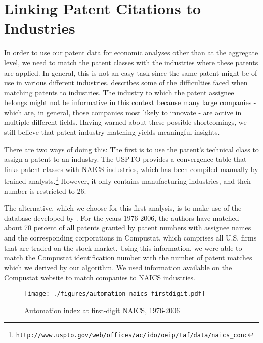 \documentclass[11pt,a4paper]{article}
\begin{document}
\section{Linking Patent Citations to Industries}
In order to use our patent data for economic analyses other than at the aggregate level, we need to match the patent classes with the industries where these patents are applied. In general, this is not an easy task since the same patent might be of use in various different industries. \cite{G1998} describes some of the difficulties faced when matching patents to industries. The industry to which the patent assignee belongs might not be informative in this context because many large companies - which are, in general, those companies most likely to innovate - are active in multiple different fields. Having warned about these possible shortcomings, we still believe that patent-industry matching yields meaningful insights.%

There are two ways of doing this: The first is to use the patent's technical class to assign a patent to an industry. The USPTO provides a convergence table that links patent classes with NAICS industries, which has been compiled manually by trained analysts.\footnote{\href{http://www.uspto.gov/web/offices/ac/ido/oeip/taf/data/naics_conc/2013/read_me.txt}{\texttt{http://www.uspto.gov/web/offices/ac/ido/oeip/taf/data/naics\_conc}}} However, it only contains manufacturing industries, and their number is restricted to 26. 

The alternative, which we choose for this first analysis, is to make use of the database developed by \cite{HJT2001}. For the years 1976-2006, the authors have matched about 70 percent of all patents granted by patent numbers with assignee names and the corresponding corporations in Compustat, which comprises all U.S. firms that are traded on the stock market. Using this information, we were able to match the Compustat identification number with the number of patent matches which we derived by our algorithm. We used information available on the Compustat website to match companies to NAICS industries. 

\begin{figure}[tb]
	\caption{Automation index at first-digit NAICS, 1976-2006}
	\centering
	\texttt{[image: ./figures/automation\_naics\_firstdigit.pdf]}\\
	\label{fig:automation_naics_firstdigit}
\end{figure}
\end{document}
